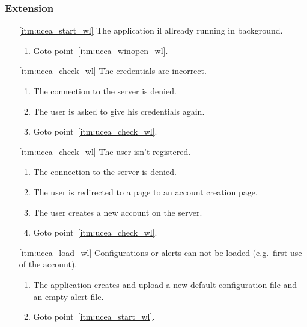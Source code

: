 \subsubsection{Extension}
\begin{enumerate}
	\item[\ref{itm:ucea_start_wl}] The application il allready running in background.
	\begin{enumerate}[i]
		\item Goto point~\ref{itm:ucea_winopen_wl}.
	\end{enumerate}
	
	\item[\ref{itm:ucea_check_wl}] The credentials are incorrect.
	\begin{enumerate}[i]
		\item The connection to the server is denied.
		\item The user is asked to give his credentials again.
		\item Goto point~\ref{itm:ucea_check_wl}.
	\end{enumerate}
	
		\item[\ref{itm:ucea_check_wl}] The user isn't registered.
	\begin{enumerate}[i]
		\item The connection to the server is denied.
		\item The user is redirected to a page to an account creation page.
		\item The user creates a new account on the server.
		\item Goto point~\ref{itm:ucea_check_wl}.
	\end{enumerate}
	
	\item[\ref{itm:ucea_load_wl}] Configurations or alerts can not be loaded (e.g.\ first use of the account).
	\begin{enumerate}[i]
		\item The application creates and upload a new default configuration file and an empty alert file.
		\item Goto point~\ref{itm:ucea_start_wl}.
	\end{enumerate}
\end{enumerate}
